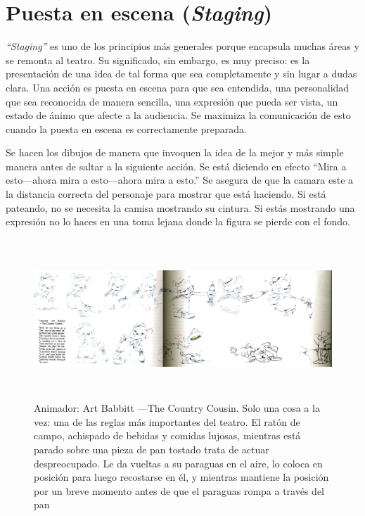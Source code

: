\documentclass[a4paper,12pt]{report}
\begin{document}
\newpage
 
\section{Puesta en escena (\textit{Staging})}
 
\textit{``Staging''} es uno de los principios más generales porque encapsula muchas áreas y se remonta al teatro.
Su significado, sin embargo, es muy preciso: es la presentación de una idea de tal forma que sea completamente
y sin lugar a dudas clara. Una acción es puesta en escena para que sea entendida, una personalidad que sea reconocida de manera sencilla,
una expresión que pueda ser vista, un estado de ánimo que afecte a la audiencia. Se maximiza la comunicación de esto
cuando la puesta en escena es correctamente preparada.\cite{principles_animation}
 
 
Se hacen los dibujos de manera que invoquen la idea de la mejor y más simple manera antes de saltar a la siguiente acción.
Se está diciendo en efecto ``Mira a esto---ahora mira a esto---ahora mira a esto.'' Se asegura de que la camara este a la distancia correcta del personaje
para mostrar que está haciendo. Si está pateando, no se necesita la camisa mostrando su cintura. Si estás mostrando una expresión
no lo haces en una toma lejana donde la figura se pierde con el fondo.\cite{principles_animation}
 
 
\begin{figure}[ht]
    \hspace*{-2cm}
    \includegraphics[height=6cm]{Imagenes/the_country_cousin}
    \caption{Animador: Art Babbitt ---The Country Cousin.
    Solo una cosa a la vez: una de las reglas más importantes del teatro. El ratón de campo, achispado de bebidas y comidas lujosas,
    mientras está parado sobre una pieza de pan tostado trata de actuar despreocupado. Le da vueltas a su paraguas en el aire, lo coloca en posición
    para luego recostarse en él, y mientras mantiene la posición por un breve momento antes de que el paraguas rompa a través del pan}
    \label{fig:the_country_cousin}
\end{figure}
 
\end{document}
